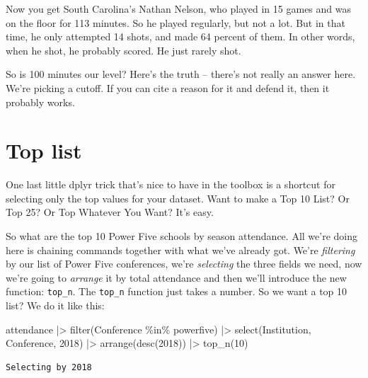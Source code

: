 \documentclass[
  letterpaper,
  DIV=11,
  numbers=noendperiod]{scrreprt}
\newenvironment{Shaded}{\begin{snugshade}}{\end{snugshade}}
\newcommand{\AttributeTok}[1]{\textcolor[rgb]{0.40,0.45,0.13}{#1}}
\newcommand{\DecValTok}[1]{\textcolor[rgb]{0.68,0.00,0.00}{#1}}
\newcommand{\FunctionTok}[1]{\textcolor[rgb]{0.28,0.35,0.67}{#1}}
\newcommand{\NormalTok}[1]{\textcolor[rgb]{0.00,0.23,0.31}{#1}}
\newcommand{\SpecialCharTok}[1]{\textcolor[rgb]{0.37,0.37,0.37}{#1}}
\newcommand{\StringTok}[1]{\textcolor[rgb]{0.13,0.47,0.30}{#1}}
\begin{document}
Now you get South Carolina's Nathan Nelson, who played in 15 games and
was on the floor for 113 minutes. So he played regularly, but not a lot.
But in that time, he only attempted 14 shots, and made 64 percent of
them. In other words, when he shot, he probably scored. He just rarely
shot.

So is 100 minutes our level? Here's the truth -- there's not really an
answer here. We're picking a cutoff. If you can cite a reason for it and
defend it, then it probably works.

\hypertarget{top-list}{%
\section{Top list}\label{top-list}}

One last little dplyr trick that's nice to have in the toolbox is a
shortcut for selecting only the top values for your dataset. Want to
make a Top 10 List? Or Top 25? Or Top Whatever You Want? It's easy.

So what are the top 10 Power Five schools by season attendance. All
we're doing here is chaining commands together with what we've already
got. We're \emph{filtering} by our list of Power Five conferences, we're
\emph{selecting} the three fields we need, now we're going to
\emph{arrange} it by total attendance and then we'll introduce the new
function: \texttt{top\_n}. The \texttt{top\_n} function just takes a
number. So we want a top 10 list? We do it like this:

\begin{Shaded}
\begin{Highlighting}[]
\NormalTok{attendance }\SpecialCharTok{|\textgreater{}} \FunctionTok{filter}\NormalTok{(Conference }\SpecialCharTok{\%in\%}\NormalTok{ powerfive) }\SpecialCharTok{|\textgreater{}} \FunctionTok{select}\NormalTok{(Institution, Conference, }\StringTok{\textasciigrave{}}\AttributeTok{2018}\StringTok{\textasciigrave{}}\NormalTok{) }\SpecialCharTok{|\textgreater{}} \FunctionTok{arrange}\NormalTok{(}\FunctionTok{desc}\NormalTok{(}\StringTok{\textasciigrave{}}\AttributeTok{2018}\StringTok{\textasciigrave{}}\NormalTok{)) }\SpecialCharTok{|\textgreater{}} \FunctionTok{top\_n}\NormalTok{(}\DecValTok{10}\NormalTok{)}
\end{Highlighting}
\end{Shaded}

\begin{verbatim}
Selecting by 2018
\end{verbatim}
\end{document}
